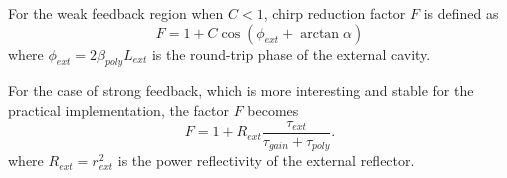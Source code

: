 For the weak feedback region when $C<1$, chirp reduction factor $F$ is defined as \cite{petermann2012laser,coldren2012diode}
\begin{equation}
    F=1+C\cos(\phi_{ext}+\arctan\alpha)
    \label{eq:F_weak_feedback}
\end{equation}
where $\phi_{ext}=2\beta_{poly}L_{ext}$ is the round-trip phase of the external cavity.

For the case of strong feedback, which is more interesting and stable for the practical implementation, the factor $F$ becomes \cite{ishii2017narrow}
\begin{equation}
    F=1+R_{ext}\frac{\tau_{ext}}{\tau_{gain}+\tau_{poly}}.
    \label{eq:F_strong_feedback}
\end{equation}
where $R_{ext}=r_{ext}^2$ is the power reflectivity of the external reflector.



